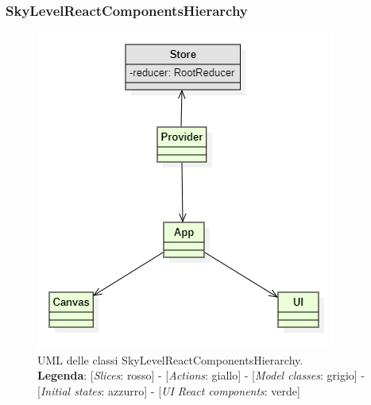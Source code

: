 		\subsubsection{SkyLevelReactComponentsHierarchy}
		\begin{figure}[H]
			\centering
			\includegraphics[scale=0.75, keepaspectratio]{./res/images/SkyLevelReactComponentHierarchy.PNG}
			\caption[UML delle classi SkyLevelReactComponentsHierarchy]{
			UML delle classi SkyLevelReactComponentsHierarchy.
			\\
			\textbf{Legenda}: 
			[\textit{Slices}: rosso] -
			[\textit{Actions}: giallo] -
			[\textit{Model classes}: grigio] -
			[\textit{Initial states}: azzurro] -
			[\textit{UI React components}: verde]}
		\end{figure}

